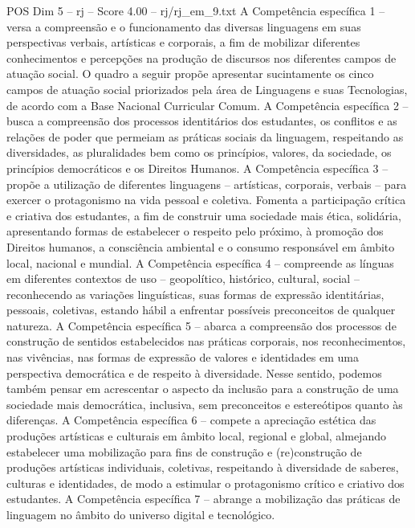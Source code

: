 \begin{textsample}{POS Dim 5 – rj – Score 4.00 – rj/rj\_em\_9.txt}  \label{ex:f5_pos_196}
A Competência específica 1 – versa a compreensão e o funcionamento das diversas linguagens em suas perspectivas verbais, artísticas e corporais, a fim de mobilizar diferentes conhecimentos e percepções na produção de discursos nos diferentes campos de atuação social.
O quadro a seguir propõe apresentar sucintamente os cinco campos de atuação social priorizados pela área de Linguagens e suas Tecnologias, de acordo com a Base Nacional Curricular Comum.
A Competência específica 2 – busca a compreensão dos processos identitários dos estudantes, os conflitos e as relações de poder que permeiam as práticas sociais da linguagem, respeitando as diversidades, as pluralidades bem como os princípios, valores, da sociedade, os princípios democráticos e os Direitos Humanos.
A Competência específica 3 – propõe a utilização de diferentes linguagens – artísticas, corporais, verbais – para exercer o protagonismo na vida pessoal e coletiva.
Fomenta a participação crítica e criativa dos estudantes, a fim de construir uma sociedade mais ética, solidária, apresentando formas de estabelecer o respeito pelo próximo, à promoção dos Direitos humanos, a consciência ambiental e o consumo responsável em âmbito local, nacional e mundial.
A Competência específica 4 – compreende as línguas em diferentes contextos de uso – geopolítico, histórico, cultural, social – reconhecendo as variações linguísticas, suas formas de expressão identitárias, pessoais, coletivas, estando hábil a enfrentar possíveis preconceitos de qualquer natureza.
A Competência específica 5 – abarca a compreensão dos processos de construção de sentidos estabelecidos nas práticas corporais, nos reconhecimentos, nas vivências, nas formas de expressão de valores e identidades em uma perspectiva democrática e de respeito à diversidade.
Nesse sentido, podemos também pensar em acrescentar o aspecto da inclusão para a construção de uma sociedade mais democrática, inclusiva, sem preconceitos e estereótipos quanto às diferenças.
A Competência específica 6 – compete a apreciação estética das produções artísticas e culturais em âmbito local, regional e global, almejando estabelecer uma mobilização para fins de construção e (re)construção de produções artísticas individuais, coletivas, respeitando à diversidade de saberes, culturas e identidades, de modo a estimular o protagonismo crítico e criativo dos estudantes.
A Competência específica 7 – abrange a mobilização das práticas de linguagem no âmbito do universo digital e tecnológico.

\end{textsample}
